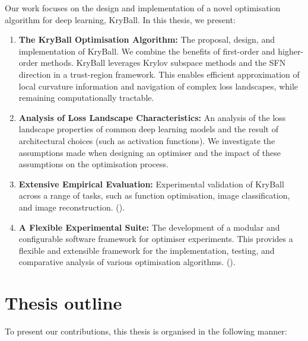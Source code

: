 Our work focuses on the design and implementation of a novel optimisation algorithm for deep learning, KryBall. In this thesis, we present:
\begin{enumerate}
    \item \textbf{The KryBall Optimisation Algorithm:} The proposal, design, and implementation of KryBall. We combine the benefits of first-order and higher-order methods. KryBall leverages Krylov subspace methods and the SFN direction in a trust-region framework. This enables efficient approximation of local curvature information and navigation of complex loss landscapes, while remaining computationally tractable.
    \item \textbf{Analysis of Loss Landscape Characteristics:} An analysis of the loss landscape properties of common deep learning models and the result of architectural choices (such as activation functions). We investigate the assumptions made when designing an optimiser and the impact of these assumptions on the optimisation process.
    \item \textbf{Extensive Empirical Evaluation:} Experimental validation of KryBall across a range of tasks, such as function optimisation, image classification, and image reconstruction. 
    (\color{red}{can also add the interpretability work here if needs to be more diverse.}\color{black}).
    \item \textbf{A Flexible Experimental Suite:} The development of a modular and configurable software framework for optimiser experiments. This provides a flexible and extensible framework for the implementation, testing, and comparative analysis of various optimisation algorithms. 
    (\color{red}{while not research --- I do think the current framework is a good software suite for a range of tasks that I haven't seen much for optimiser research (except MLPerf). It's quite easy to use, efficient, and extensible. Happy to remove if it doesn't really count as a contribution.}\color{black}).
\end{enumerate}

\section{Thesis outline}
\label{sec:thesis_outline}

To present our contributions, this thesis is organised in the following manner:

